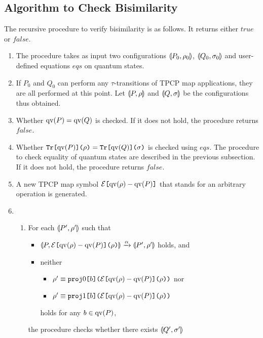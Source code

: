\subsection{Algorithm to Check Bisimilarity}
\label{symqccs:algorithmforbisim}
The recursive procedure to verify bisimilarity is as follows.
It returns either $\mathit{true}$ or $\mathit{false}$.
\begin{enumerate}
\item The procedure takes as input two configurations $\llparenthesis P_0, \rho_0 \rrparenthesis$,
      $\llparenthesis Q_0, \sigma_0 \rrparenthesis$ and user-defined equations $\mathit{eqs}$
      on quantum states.
\item If $P_0$ and $Q_0$ can perform any $\tau$-transitions of
      TPCP map applications, they are all performed at this point.
      Let $\llparenthesis P, \rho \rrparenthesis$ and $\llparenthesis Q, \sigma \rrparenthesis$ be the configurations
      thus obtained.
\item Whether $\mathrm{qv}(P) = \mathrm{qv}(Q)$ is checked. If it does not hold, the
      procedure returns $\mathit{false}$.
\item Whether $\texttt{Tr[}\mathrm{qv}(P)\texttt{](}\rho\texttt{)} = \texttt{Tr[}\mathrm{qv}(Q)\texttt{](}\sigma\texttt{)}$ is 
      checked
      using $\mathit{eqs}$.
      The procedure to check equality of quantum states are described
      in the previous subsection.
      If it does not hold, the procedure returns $\mathit{false}$.
\item A new TPCP map symbol $\mathcal{E}\texttt{[}\mathrm{qv}(\rho) - \mathrm{qv}(P)\texttt{]}$
      that stands for an
      arbitrary operation is generated.
\item \begin{enumerate}
       \item For each $\llparenthesis P', \rho' \rrparenthesis$ such that
	     \begin{itemize}
	      \item $\llparenthesis P, \mathcal{E}\texttt{[}\mathrm{qv}(\rho) - \mathrm{qv}(P)\texttt{]}\texttt{(}\rho\texttt{)} \rrparenthesis
		    \xrightarrow{\alpha}
		    \llparenthesis P', \rho' \rrparenthesis$ holds, and
	      \item  neither 
		     \begin{itemize}
		      \item $\rho' \equiv 
			    \texttt{proj}0\texttt{[}b\texttt{]}\texttt{(}
			    \mathcal{E}\texttt{[}\mathrm{qv}(\rho) -\mathrm{qv}(P)\texttt{]}\texttt{(}\rho\texttt{)}\texttt{)}$ nor
		      \item $\rho' \equiv 
			    \texttt{proj}1\texttt{[}b\texttt{]}\texttt{(}
			    \mathcal{E}\texttt{[}\mathrm{qv}(\rho) -\mathrm{qv}(P)\texttt{]}\texttt{(}\rho\texttt{)}\texttt{)}$
		     \end{itemize}
		     holds for any $b \in \mathrm{qv}(P)$,
	     \end{itemize}
	     the procedure checks whether there exists
	     $\llparenthesis Q', \sigma' \rrparenthesis$

\end{enumerate}
\end{enumerate}
